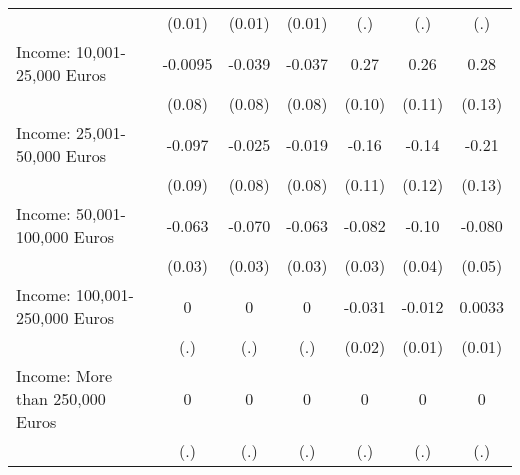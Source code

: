 {\begin{tabular}{l*{6}{c}}
            &      (0.01)         &      (0.01)         &      (0.01)         &         (.)         &         (.)         &         (.)         \\
\addlinespace
Income: 10,001-25,000 Euros&     -0.0095         &      -0.039         &      -0.037         &        0.27\sym{**} &        0.26\sym{*}  &        0.28\sym{*}  \\
            &      (0.08)         &      (0.08)         &      (0.08)         &      (0.10)         &      (0.11)         &      (0.13)         \\
\addlinespace
Income: 25,001-50,000 Euros&      -0.097         &      -0.025         &      -0.019         &       -0.16         &       -0.14         &       -0.21         \\
            &      (0.09)         &      (0.08)         &      (0.08)         &      (0.11)         &      (0.12)         &      (0.13)         \\
\addlinespace
Income: 50,001-100,000 Euros&      -0.063\sym{*}  &      -0.070\sym{*}  &      -0.063\sym{*}  &      -0.082\sym{**} &       -0.10\sym{**} &      -0.080         \\
            &      (0.03)         &      (0.03)         &      (0.03)         &      (0.03)         &      (0.04)         &      (0.05)         \\
\addlinespace
Income: 100,001-250,000 Euros&           0         &           0         &           0         &      -0.031         &      -0.012         &      0.0033         \\
            &         (.)         &         (.)         &         (.)         &      (0.02)         &      (0.01)         &      (0.01)         \\
\addlinespace
Income: More than 250,000 Euros&           0         &           0         &           0         &           0         &           0         &           0         \\
            &         (.)         &         (.)         &         (.)         &         (.)         &         (.)         &         (.)         \\
\bottomrule
\end{tabular}
}
